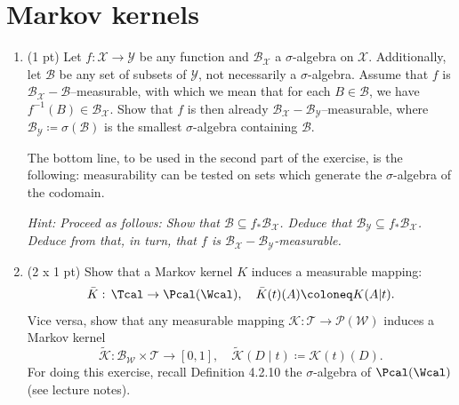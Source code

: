\section{Markov kernels} %
\begin{enumerate} 
  \item (1 pt) 
    Let $f: \mathcal{X} \to \mathcal{Y}$ be any function and $\mathcal{B}_{\mathcal{X}}$ a $\sigma$-algebra on $\mathcal{X}$.
    Additionally, let $\mathcal{B}$ be any set of subsets of $\mathcal{Y}$, not necessarily a $\sigma$-algebra.
    Assume that $f$ is $\mathcal{B}_{\mathcal{X}}-\mathcal{B}$--measurable, with which we mean that for each $B \in \mathcal{B}$, we have $f^{-1}(B) \in \mathcal{B}_{\mathcal{X}}$.
    Show that $f$ is then already $\mathcal{B}_\mathcal{X}-\mathcal{B}_{\mathcal{Y}}$--measurable, where $\mathcal{B}_{\mathcal{Y}} \coloneq \sigma{(\mathcal{B})}$ is the smallest $\sigma$-algebra containing $\mathcal{B}$.

    The bottom line, to be used in the second part of the exercise, is the following: measurability can be tested on sets which generate the $\sigma$-algebra of the codomain.
    
    \emph{Hint: Proceed as follows: Show that $\mathcal{B} \subseteq f_*\mathcal{B}_{\mathcal{X}}$. 
    Deduce that $\mathcal{B}_{\mathcal{Y}} \subseteq f_* \mathcal{B}_{\mathcal{X}}$.
  Deduce from that, in turn, that $f$ is $\mathcal{B}_{\mathcal{X}}-\mathcal{B}_{\mathcal{Y}}$-measurable.}
\item (2 x 1 pt)
    Show that a Markov kernel $K$ induces a measurable mapping:
    \[ \bar K:\, \Tcal \to \Pcal(\Wcal),\quad  \bar K(t)(A)  \coloneq K(A|t).  \]%
    Vice versa, show that any measurable mapping $\mathcal{K}: \mathcal{T} \to \mathcal{P}(\mathcal{W})$ induces a Markov kernel
    \begin{equation}
      \widetilde{\mathcal{K}}: \mathcal{B}_{\mathcal{W}} \times \mathcal{T} \to [0,1],\quad \widetilde{\mathcal{K}}(D \mid t) \coloneq \mathcal{K}(t)(D).
      \label{eq:other_direction_def}
    \end{equation}
    For doing this exercise, recall Definition 4.2.10 
     the $\sigma$-algebra of  $\Pcal(\Wcal)$ (see lecture notes).\\
\end{enumerate}

